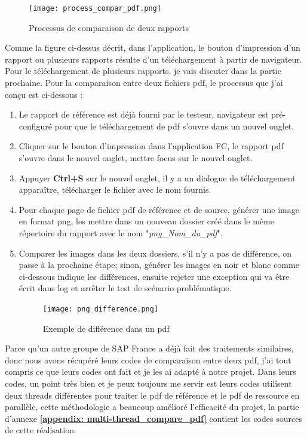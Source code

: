     \begin{figure}[H]
        \centering
        \texttt{[image: process\_compar\_pdf.png]}
        \caption{Processus de comparaison de deux rapports}
        \label{fig:proc_compar_report_label}
    \end{figure}
    Comme la figure ci-dessus décrit, dans l'application, le bouton d'impression d'un rapport ou plusieurs rapports résulte d'un téléchargement à partir de navigateur. Pour le téléchargement de plusieurs rapports, je vais discuter dans la partie prochaine. Pour la comparaison entre deux fichiers pdf, le processus que j'ai conçu est ci-dessous : 
    \begin{enumerate}[label=\arabic*)]
        \item Le rapport de référence est déjà fourni par le testeur, navigateur est pré-configuré pour que le téléchargement de pdf s'ouvre dans un nouvel onglet.
        \item Cliquer sur le bouton d'impression dans l'application FC, le rapport pdf s'ouvre dans le nouvel onglet, mettre focus sur le nouvel onglet.
        \item Appuyer \textbf{Ctrl+S} sur le nouvel onglet, il y a un dialogue de téléchargement apparaître, télécharger le fichier avec le nom fournis.
        \item Pour chaque page de fichier pdf de référence et de source, générer une image en format png, les mettre dans un nouveau dossier créé dans le même répertoire du rapport avec le nom "\textit{png\_Nom\_du\_pdf}".
        \item Comparer les images dans les deux dossiers, s'il n'y a pas de différence, on passe à la prochaine étape; sinon, générer les images en noir et blanc comme ci-dessous indique les différences, ensuite rejeter une exception qui va être écrit dans log et arrêter le test de scénario problématique.
        \begin{figure}[H]
            \centering
            \texttt{[image: png\_difference.png]}
            \caption{Exemple de différence dans un pdf}
            \label{fig:exemple_pdf_diff_label}
        \end{figure}
    \end{enumerate}
    
    Parce qu'un autre groupe de SAP France a déjà fait des traitements similaires, donc nous avons récupéré leurs codes de comparaison entre deux pdf, j'ai tout compris ce que leurs codes ont fait et je les ai adapté à notre projet. Dans leurs codes, un point très bien et je peux toujours me servir est leurs codes utilisent deux threads différentes pour traiter le pdf de référence et le pdf de ressource en parallèle, cette méthodologie a beaucoup amélioré l'efficacité du projet, la partie d'annexe \textbf{\ref{appendix: multi-thread_compare_pdf}} contient les codes sources de cette réalisation. 
    
